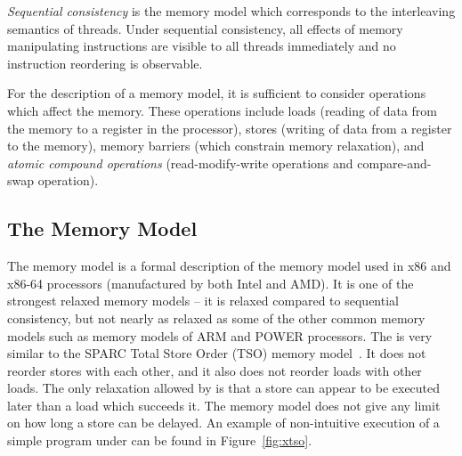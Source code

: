 \begin{definition}
    \emph{Sequential consistency} is the memory model which corresponds to the
    interleaving semantics of threads.
    Under sequential consistency, all effects of memory manipulating
    instructions are visible to all threads immediately and no instruction
    reordering is observable.
\end{definition}

For the description of a memory model, it is sufficient to consider operations
which affect the memory.
These operations include loads (reading of data from the memory to a register
in the processor), stores (writing of data from a register to the memory),
memory barriers (which constrain memory relaxation), and \emph{atomic compound
operations} (read-modify-write operations and compare-and-swap operation).

\subsection{The \xtso Memory Model}

The \xtso memory model is a formal description of the memory model used in x86
and x86-64 processors (manufactured by both Intel and AMD).
It is one of the strongest relaxed memory models -- it is relaxed compared to
sequential consistency, but not nearly as relaxed as some of the other common
memory models such as memory models of ARM and POWER processors.
The \xtso is very similar to the SPARC Total Store Order (TSO) memory
model~\cite{SPARC94}.
It does not reorder stores with each other, and it also does not reorder loads
with other loads.
The only relaxation allowed by \xtso is that a store can appear to be executed
later than a load which succeeds it.
The memory model does not give any limit on how long a store can be delayed.
An example of non-intuitive execution of a simple program under \xtso can be
found in Figure~\ref{fig:xtso}.

